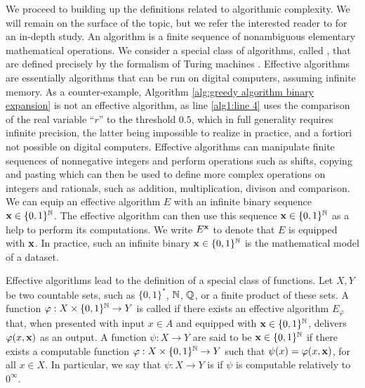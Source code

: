 We proceed to building up the definitions related to algorithmic complexity. We will remain on the surface of the topic, but we refer the interested reader to \cite{li2008introduction} for an in-depth study. An algorithm is a finite sequence of nonambiguous elementary mathematical operations. We consider a special class of algorithms, called , that are defined precisely by the formalism of Turing machines \cite{turing1936computable}. Effective algorithms are essentially algorithms that can be run on digital computers, assuming infinite memory. As a counter-example, Algorithm \ref{alg:greedy algorithm binary expansion} is not an effective algorithm, as line \ref{alg1:line 4} uses the comparison of the real variable ``$r$'' to the threshold $0.5$, which in full generality requires infinite precision, the latter being impossible to realize in practice, and a fortiori not possible on digital computers. Effective algorithms can manipulate finite sequences of nonnegative integers and perform operations such as shifts, copying and pasting which can then be used to define more complex operations on integers and rationals, such as addition, multiplication, divison and comparison. We can equip an effective algorithm $E$ with an infinite binary sequence ${\bf x} \in \{0,1\}^{\mathbb{N}}$. The effective algorithm can then use this sequence ${\bf x} \in \{0,1\}^{\mathbb{N}}$ as a help to perform its computations. We write $E^{\bf x}$ to denote that $E$ is equipped with ${\bf x}$. In practice, such an infinite binary ${\bf x} \in \{0,1\}^{\mathbb{N}}$ is the mathematical model of a dataset.

Effective algorithms lead to the definition of a special class of functions. Let $X,Y$ be two countable sets, such as $\{0,1\}^\ast$, $\mathbb{N}$, $\mathbb{Q}$, or a finite product of these sets. A function $\varphi : X \times \{0,1\}^{\mathbb{N}} \to Y$ is called  if there exists an effective algorithm $E_\varphi$ that, when presented with input $x \in A$ and equipped with ${\bf x} \in \{0,1\}^{\mathbb{N}}$, delivers $\varphi(x, {\bf x})$ as an output. A function $\psi : X \to Y$ are said to be  ${\bf x} \in \{0,1\}^{\mathbb{N}}$ if there exists a computable function $\varphi : X \times \{0,1\}^{\mathbb{N}} \to Y$ such that $\psi(x) = \varphi(x, {\bf x})$, for all $x \in X$. In particular, we say that $\psi : X \to Y$ is  if $\psi$ is computable relatively to $0^\infty$.



